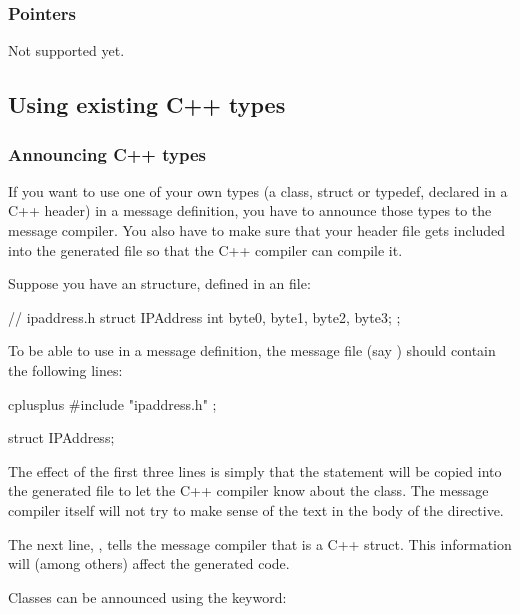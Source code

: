 \subsubsection{Pointers}

Not supported yet.



\subsection{Using existing C++ types}


\subsubsection{Announcing C++ types}

If you want to use one of your own types (a class, struct or typedef,
declared in a C++ header) in a message definition, you have to
announce those types to the message compiler. You also have to make sure
that your header file gets included into the generated  file
so that the C++ compiler can compile it.

Suppose you have an  structure, defined in an 
file:

\begin{cpp}
// ipaddress.h
struct IPAddress {
    int byte0, byte1, byte2, byte3;
};
\end{cpp}

To be able to use  in a message definition, the message
file (say ) should contain the following lines:

\begin{msg}
cplusplus {{
#include "ipaddress.h"
}};

struct IPAddress;
\end{msg}

The effect of the first three lines is simply that the 
statement will be copied into the generated 
file to let the C++ compiler know about the  class.
The message compiler itself will not try to make sense of the
text in the body of the  directive.

The next line, , tells the message compiler that
 is a C++ struct. This information will (among others)
affect the generated code.

Classes can be announced using the  keyword:

